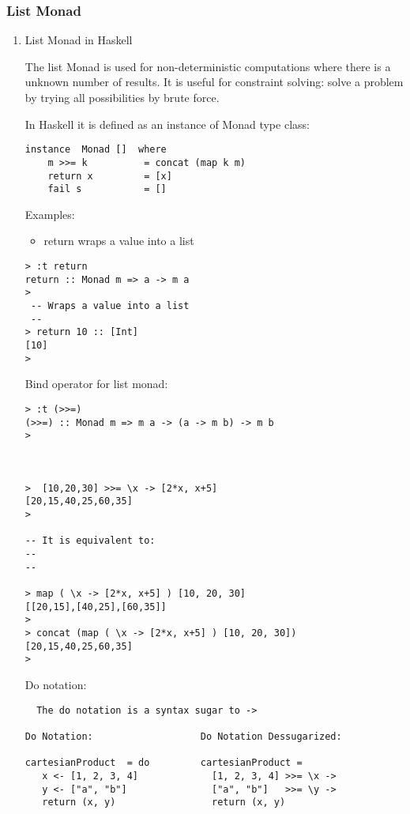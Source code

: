 \documentclass[11pt]{article}
\begin{document}
\subsubsection{List Monad}
\label{sec-1-13-2}
\begin{enumerate}
\item List Monad in Haskell
\label{sec-1-13-2-1}

The list Monad is used for non-deterministic computations where there
is a unknown number of results. It is useful for constraint solving:
solve a problem by trying all possibilities by brute force.

In Haskell it is defined as an instance of Monad type class:

\begin{verbatim}
instance  Monad []  where
    m >>= k          = concat (map k m)
    return x         = [x]
    fail s           = []
\end{verbatim}

Examples: 

\begin{itemize}
\item return wraps a value into a list
\end{itemize}

\begin{verbatim}
> :t return
return :: Monad m => a -> m a
> 
 -- Wraps a value into a list 
 -- 
> return 10 :: [Int]
[10]
>
\end{verbatim}


Bind operator for list monad: 

\begin{verbatim}
> :t (>>=)
(>>=) :: Monad m => m a -> (a -> m b) -> m b
> 

 

>  [10,20,30] >>= \x -> [2*x, x+5] 
[20,15,40,25,60,35]
> 

-- It is equivalent to: 
--
--  

> map ( \x -> [2*x, x+5] ) [10, 20, 30]
[[20,15],[40,25],[60,35]]
> 
> concat (map ( \x -> [2*x, x+5] ) [10, 20, 30])
[20,15,40,25,60,35]
>
\end{verbatim}

Do notation:

\begin{verbatim}
  The do notation is a syntax sugar to -> 
 
Do Notation:                   Do Notation Dessugarized: 

cartesianProduct  = do         cartesianProduct = 
   x <- [1, 2, 3, 4]             [1, 2, 3, 4] >>= \x ->
   y <- ["a", "b"]               ["a", "b"]   >>= \y ->
   return (x, y)                 return (x, y) 


\end{verbatim}
\end{enumerate}
\end{document}
